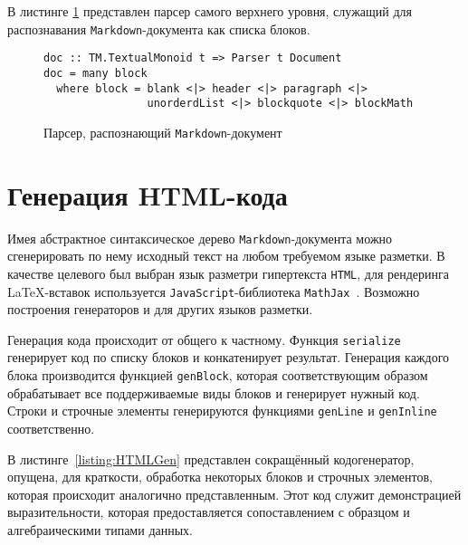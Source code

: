 В листинге \ref{listing:MarkdownDoc} представлен парсер самого верхнего уровня,
служащий для распознавания \lstinline{Markdown}-документа как списка блоков.

\begin{figure}[h]
\begin{lstlisting}
doc :: TM.TextualMonoid t => Parser t Document
doc = many block
  where block = blank <|> header <|> paragraph <|>
                unorderdList <|> blockquote <|> blockMath
\end{lstlisting}
\caption{Парсер, распознающий \lstinline{Markdown}-документ}
\label{listing:MarkdownDoc}
\end{figure}

\section{Генерация HTML-кода}

Имея абстрактное синтаксическое дерево \lstinline{Markdown}-документа можно
сгенерировать по нему исходный текст на любом требуемом языке разметки.
В качестве целевого был выбран язык разметри гипертекста \lstinline{HTML}, для рендеринга
\LaTeX-вставок используется \lstinline{JavaScript}-библиотека
\lstinline{MathJax}~\cite{mathJax}. Возможно построения генераторов и для
других языков разметки.

Генерация кода происходит от общего к частному. Функция \lstinline{serialize}
генерирует код по списку блоков и конкатенирует результат. Генерация каждого 
блока производится функцией \lstinline{genBlock}, которая соответствующим
образом обрабатывает все поддерживаемые виды блоков и генерирует нужный код. 
Строки и строчные элементы генерируются функциями \lstinline{genLine} и 
\lstinline{genInline} соответственно.

В листинге~\ref{listing:HTMLGen} представлен сокращённый кодогенератор, опущена,
для краткости, обработка некоторых блоков и строчных элементов, которая
происходит аналогично представленным. Этот код служит демонстрацией
выразительности, которая предоставляется сопоставлением с образцом и
алгебраическими типами данных.

